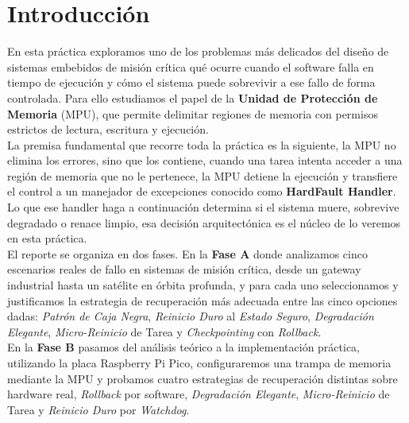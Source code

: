 \documentclass[12pt,letterpaper]{article}
\begin{document}


\newpage

\section*{Introducción}
En esta práctica exploramos uno de los problemas más delicados del diseño de sistemas embebidos de misión crítica
qué ocurre cuando el software falla en tiempo de ejecución y cómo el sistema puede sobrevivir a ese fallo de
forma controlada. Para ello estudiamos el papel de la \textbf{Unidad de Protección de Memoria} (MPU), que permite
delimitar regiones de memoria con permisos estrictos de lectura, escritura y ejecución.\\
 
La premisa fundamental que recorre toda la práctica es la siguiente, la MPU no elimina los errores, sino que los
contiene, cuando una tarea intenta acceder a una región de memoria que no le pertenece, la MPU detiene la
ejecución y transfiere el control a un manejador de excepciones conocido como \textbf{HardFault Handler}.
Lo que ese handler haga a continuación determina si el sistema muere, sobrevive degradado o renace limpio,
esa decisión arquitectónica es el núcleo de lo veremos en esta práctica.\\
 
El reporte se organiza en dos fases. En la \textbf{Fase A} donde analizamos cinco escenarios reales de fallo en
sistemas de misión crítica, desde un gateway industrial hasta un satélite en órbita profunda, y para cada uno
seleccionamos y justificamos la estrategia de recuperación más adecuada entre las cinco opciones dadas:
\textit{Patrón de Caja Negra}, \textit{Reinicio Duro} al \textit{Estado Seguro}, \textit{Degradación Elegante},
\textit{Micro-Reinicio} de Tarea y \textit{Checkpointing} con \textit{Rollback}.\\
 
En la \textbf{Fase B} pasamos del análisis teórico a la implementación práctica, utilizando la placa
Raspberry Pi Pico, configuraremos una trampa de memoria mediante la MPU y probamos cuatro estrategias de
recuperación distintas sobre hardware real, \textit{Rollback} por software, \textit{Degradación Elegante},
\textit{Micro-Reinicio} de Tarea y \textit{Reinicio Duro} por \textit{Watchdog}.


\newpage

 
\end{document}
